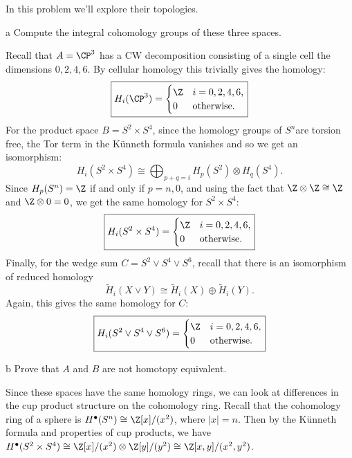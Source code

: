 \documentclass[11pt,letterpaper]{article}
\begin{document}
\begin{solution}
    In this problem we'll explore their topologies.
    \begin{partproblem}{a}
        Compute the integral cohomology groups of these three spaces.
    \end{partproblem}
    
    \quad Recall that $A=\CP^3$ has a CW decomposition consisting of a single cell the dimensions $0, 2, 4, 6$. By cellular homology this trivially gives the homology:
    \[
        \boxed{H_i(\CP^3) = \begin{cases}
            \Z & i = 0,2,4,6,\\
            0 &\text{otherwise}.
        \end{cases}}
    \]
    For the product space $B=S^2\times S^4$, since the homology groups of $S^n$are torsion free, the Tor term in the K\"unneth formula vanishes and so we get an isomorphism:
    \[
        H_i(S^2\times S^4) \cong \bigoplus_{p+q=i} H_p(S^2)\otimes H_q(S^4)
    .\]
    Since $H_p(S^n) = \Z$ if and only if $p=n, 0$, and using the fact that $\Z\otimes \Z \cong \Z$ and $\Z\otimes 0 = 0$, we get the same homology for $S^2\times S^4:$ 
    \[
        \boxed{H_i(S^2\times S^4) = \begin{cases}
            \Z & i = 0,2,4,6,\\
            0 &\text{otherwise}.
        \end{cases}}
    \] 
    Finally, for the wedge sum $C = S^2\vee S^4\vee S^6$, recall that there is an isomorphism of reduced homology
    \[
        \widetilde{H}_i(X\vee Y) \cong \widetilde{H}_i(X)\oplus \widetilde{H}_i(Y).
    \] 
    Again, this gives the same homology for $C$:
    \[
        \boxed{H_i(S^2\vee S^4\vee S^6) = \begin{cases}
            \Z & i = 0,2,4,6,\\
            0 &\text{otherwise}.
        \end{cases}}
    \] 

    \begin{partproblem}{b}
        Prove that $A$ and $B$ are not homotopy equivalent.
    \end{partproblem}

    \quad Since these spaces have the same homology rings, we can look at differences in the cup product structure on the cohomology ring. Recall that the cohomology ring of a sphere is $H^\bullet(S^n)\cong \Z[x] /(x^2)$, where $|x|=n$. Then by the K\"unneth formula and properties of cup products, we have $H^\bullet(S^2\times S^4) \cong \Z[x] /(x^2) \otimes \Z[y] / (y^2) \cong \Z[x,y]/(x^2, y^2)$. 
    

\end{solution}
\end{document}
